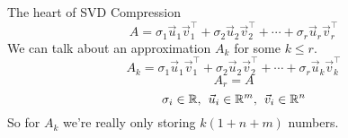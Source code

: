 \documentclass{beamer}
\begin{document}
	\begin{frame}{The heart of SVD Compression}
		\[A=\sigma_1\vec{u}_1\vec{v}_1^{\intercal}+\sigma_2\vec{u}_2\vec{v}_2^{\intercal}+\cdots+\sigma_r\vec{u}_r\vec{v}_r^{\intercal}\]
		\pause
		We can talk about an approximation $A_k$ for some $k\le r$.\pause
		\[A_k=\sigma_1\vec{u}_1\vec{v}_1^{\intercal}+\sigma_2\vec{u}_2\vec{v}_2^{\intercal}+\cdots+\sigma_r\vec{u}_k\vec{v}_k^{\intercal}\]
		\[A_r=A\]\pause
		\[\sigma_i\in\mathbb{R},\hspace{0.15cm}\vec{u}_i\in\mathbb{R}^m,\hspace{0.15cm}\vec{v}_i\in\mathbb{R}^n\]
		So for $A_k$ we're really only storing $k(1+n+m)$ numbers.
	\end{frame}
\end{document}
